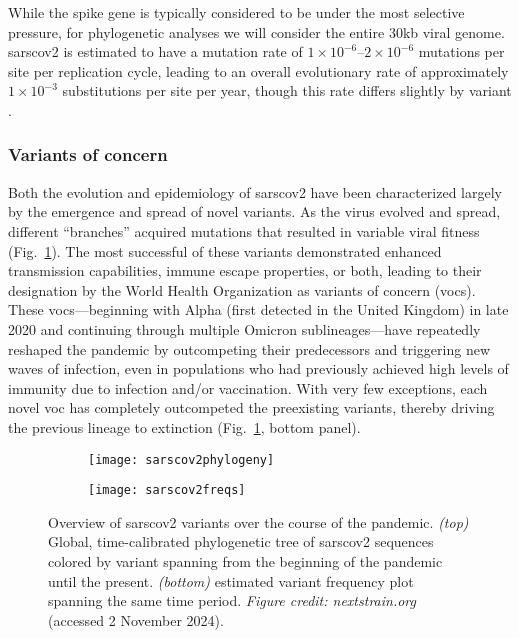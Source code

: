 While the spike gene is typically considered to be under the most selective pressure, for phylogenetic analyses we will consider the entire 30kb viral genome.
\gls{sarscov2} is estimated to have a mutation rate of $1\times10^{-6}$--$2\times10^{-6}$ mutations per site per replication cycle, leading to an overall evolutionary rate of approximately $1\times10^{-3}$ substitutions per site per year, though this rate differs slightly by variant \citep{markov2023evolution}.

\subsubsection{Variants of concern}
Both the evolution and epidemiology of \gls{sarscov2} have been characterized largely by the emergence and spread of novel variants.
As the virus evolved and spread, different ``branches'' acquired mutations that resulted in variable viral fitness (Fig.~\ref{fig:sarscov2phylo}).
The most successful of these variants demonstrated enhanced transmission capabilities, immune escape properties, or both, leading to their designation by the World Health Organization as variants of concern (\gls{voc}s).
These \gls{voc}s---beginning with Alpha (first detected in the United Kingdom) in late 2020 and continuing through multiple Omicron sublineages---have repeatedly reshaped the pandemic by outcompeting their predecessors and triggering new waves of infection, even in populations who had previously achieved high levels of immunity due to infection and/or vaccination.
With very few exceptions, each novel \gls{voc} has completely outcompeted the preexisting variants, thereby driving the previous lineage to extinction (Fig.~\ref{fig:sarscov2phylo}, bottom panel).

\begin{figure}[ht]
  \centering
  \begin{subfigure}{0.9\textwidth}
    \texttt{[image: sarscov2phylogeny]}
  \end{subfigure}
  \begin{subfigure}{0.9\textwidth}
    \texttt{[image: sarscov2freqs]}
  \end{subfigure}
  \caption[SARS-CoV-2 phylogeny and variant frequencies]{Overview of \gls{sarscov2} variants over the course of the pandemic. \textit{(top)} Global, time-calibrated phylogenetic tree of \gls{sarscov2} sequences colored by variant spanning from the beginning of the pandemic until the present. \textit{(bottom)} estimated variant frequency plot spanning the same time period. \textit{Figure credit: nextstrain.org} \citep{hadfield2018nextstrain} (accessed 2 November 2024).}
  \label{fig:sarscov2phylo}
\end{figure}

